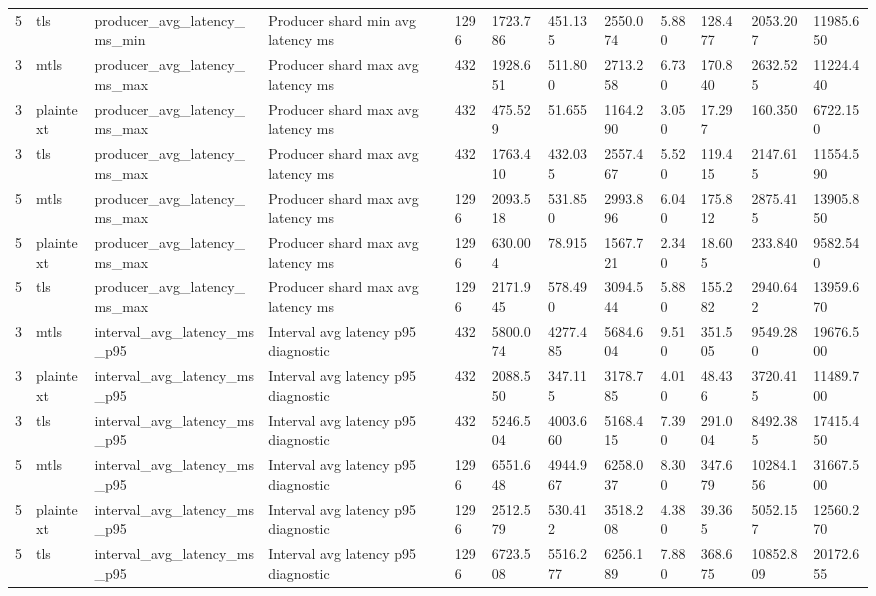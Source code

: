 \begin{longtable}{llllllllllll}
5 & tls & producer\_avg\_latency\_ms\_min & Producer shard min avg latency ms & 1296 & 1723.786 & 451.135 & 2550.074 & 5.880 & 128.477 & 2053.207 & 11985.650 \\
3 & mtls & producer\_avg\_latency\_ms\_max & Producer shard max avg latency ms & 432 & 1928.651 & 511.800 & 2713.258 & 6.730 & 170.840 & 2632.525 & 11224.440 \\
3 & plaintext & producer\_avg\_latency\_ms\_max & Producer shard max avg latency ms & 432 & 475.529 & 51.655 & 1164.290 & 3.050 & 17.297 & 160.350 & 6722.150 \\
3 & tls & producer\_avg\_latency\_ms\_max & Producer shard max avg latency ms & 432 & 1763.410 & 432.035 & 2557.467 & 5.520 & 119.415 & 2147.615 & 11554.590 \\
5 & mtls & producer\_avg\_latency\_ms\_max & Producer shard max avg latency ms & 1296 & 2093.518 & 531.850 & 2993.896 & 6.040 & 175.812 & 2875.415 & 13905.850 \\
5 & plaintext & producer\_avg\_latency\_ms\_max & Producer shard max avg latency ms & 1296 & 630.004 & 78.915 & 1567.721 & 2.340 & 18.605 & 233.840 & 9582.540 \\
5 & tls & producer\_avg\_latency\_ms\_max & Producer shard max avg latency ms & 1296 & 2171.945 & 578.490 & 3094.544 & 5.880 & 155.282 & 2940.642 & 13959.670 \\
3 & mtls & interval\_avg\_latency\_ms\_p95 & Interval avg latency p95 diagnostic & 432 & 5800.074 & 4277.485 & 5684.604 & 9.510 & 351.505 & 9549.280 & 19676.500 \\
3 & plaintext & interval\_avg\_latency\_ms\_p95 & Interval avg latency p95 diagnostic & 432 & 2088.550 & 347.115 & 3178.785 & 4.010 & 48.436 & 3720.415 & 11489.700 \\
3 & tls & interval\_avg\_latency\_ms\_p95 & Interval avg latency p95 diagnostic & 432 & 5246.504 & 4003.660 & 5168.415 & 7.390 & 291.004 & 8492.385 & 17415.450 \\
5 & mtls & interval\_avg\_latency\_ms\_p95 & Interval avg latency p95 diagnostic & 1296 & 6551.648 & 4944.967 & 6258.037 & 8.300 & 347.679 & 10284.156 & 31667.500 \\
5 & plaintext & interval\_avg\_latency\_ms\_p95 & Interval avg latency p95 diagnostic & 1296 & 2512.579 & 530.412 & 3518.208 & 4.380 & 39.365 & 5052.157 & 12560.270 \\
5 & tls & interval\_avg\_latency\_ms\_p95 & Interval avg latency p95 diagnostic & 1296 & 6723.508 & 5516.277 & 6256.189 & 7.880 & 368.675 & 10852.809 & 20172.655 \\

\end{longtable}
